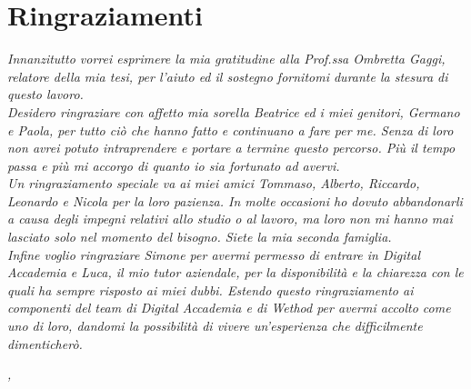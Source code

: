 
\cleardoublepage
{}
{}

\begingroup
\let\clearpage\relax
\let\cleardoublepage\relax
\let\cleardoublepage\relax

\chapter*{Ringraziamenti}

\noindent \textit{Innanzitutto vorrei esprimere la mia gratitudine alla Prof.ssa Ombretta Gaggi, relatore della mia tesi, per l'aiuto ed il sostegno fornitomi durante la stesura di questo lavoro.}\\

\noindent \textit{Desidero ringraziare con affetto mia sorella Beatrice ed i miei genitori, Germano e Paola, per tutto ciò che hanno fatto e continuano a fare per me. Senza di loro non avrei potuto intraprendere e portare a termine questo percorso. Più il tempo passa e più mi accorgo di quanto io sia fortunato ad avervi.}\\

\noindent \textit{Un ringraziamento speciale va ai miei amici Tommaso, Alberto, Riccardo, Leonardo e Nicola per la loro pazienza. In molte occasioni ho dovuto abbandonarli a causa degli impegni relativi allo studio o al lavoro, ma loro non mi hanno mai lasciato solo nel momento del bisogno. Siete la mia seconda famiglia.}\\

\noindent \textit{Infine voglio ringraziare Simone per avermi permesso di entrare in Digital Accademia e Luca, il mio tutor aziendale, per la disponibilità e la chiarezza con le quali ha sempre risposto ai miei dubbi. Estendo questo ringraziamento ai componenti del team di Digital Accademia e di Wethod per avermi accolto come uno di loro, dandomi la possibilità di vivere un'esperienza che difficilmente dimenticherò.}\\
\bigskip

\noindent\textit{\myLocation, \myTime}
\hfill \textit{\myName}

\endgroup


